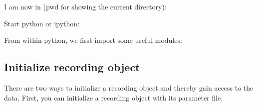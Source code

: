 \documentclass[letterpaper,10pt,english]{sphinxmanual}
\begin{document}
I am now in (pwd for showing the current directory):

%
\begin{sphinxVerbatim}[commandchars=\\\{\}]
 
\end{sphinxVerbatim}

Start python or ipython:

%
\begin{sphinxVerbatim}[commandchars=\\\{\}]
 
\end{sphinxVerbatim}

From within python, we first import some useful modules:

%
\begin{sphinxVerbatim}[commandchars=\\\{\}]
   
   
   
   
\end{sphinxVerbatim}


\subsection{Initialize recording object}
\label{\detokenize{access_results:initialize-recording-object}}
There are two ways to initialize a recording object and thereby gain access to the data. First,
you can initialize a recording object with its parameter file.

%
\begin{sphinxVerbatim}[commandchars=\\\{\}]
  
  
\end{sphinxVerbatim}
\end{document}
